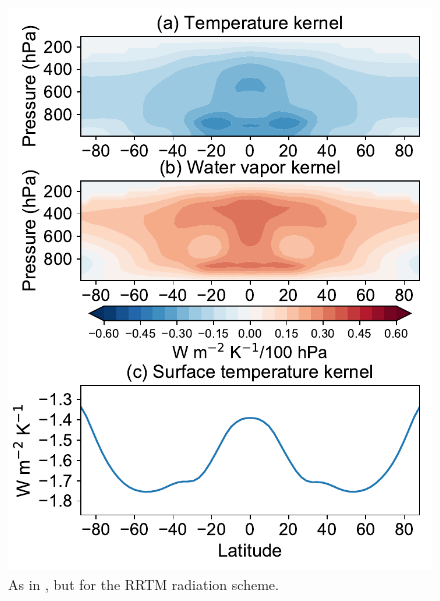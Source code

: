 \begin{figure}[ht]
	\centering
	\includegraphics[width=0.45\linewidth]{figs/polar_amp/kernels_rrtm}
	\caption[Annual-mean and zonal-mean temperature, water vapor and surface temperature radiative kernels for the RRTM radiation scheme]{As in , but for the RRTM radiation scheme.}
	\label{fig:rrtm_kernels}
\end{figure}

